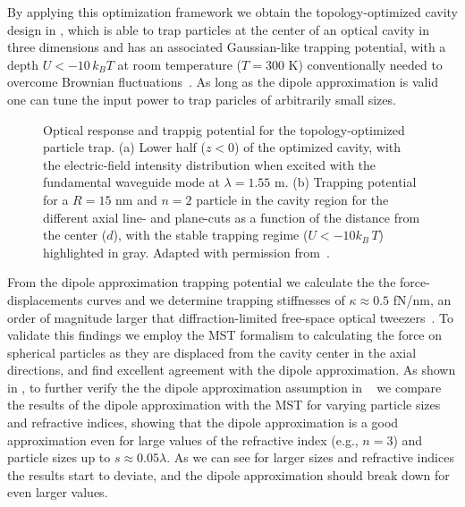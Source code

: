 By applying this optimization framework we obtain the topology-optimized cavity design in , which is able to trap particles at the center of an optical
cavity in three dimensions and has an associated Gaussian-like trapping potential, with a depth  $U<-10\, k_B T$ at room temperature ($T=300$ K) conventionally needed to overcome Brownian fluctuations~\cite{novotny}.
As long as the dipole approximation is valid one can tune the input power to trap paricles of arbitrarily small sizes.

\begin{figure}[tb]
    \centering
    \caption{Optical response and trappig potential for the topology-optimized particle trap. (a) Lower half ($z<0$) of the optimized cavity, with the electric-field intensity
    distribution when excited with the fundamental waveguide mode at $\lambda=1.55$ \textmu m. (b) Trapping potential for a $R=15$ nm and $n=2$ particle in the cavity region for the different axial line- and plane-cuts as a function
    of the distance from the center ($d$), with the stable trapping regime ($U<-10 k_B\, T$) highlighted in gray. Adapted with permission from~\cite{ownpub1}.}
    \label{fig:MST_dipole}
\end{figure}

From the dipole approximation trapping potential we calculate the the force-displacements curves and we determine trapping stiffnesses
of $\kappa \approx 0.5$ fN/nm, an order of magnitude larger that diffraction-limited free-space optical tweezers~\cite{ownpub1}. To validate this findings
we employ the MST formalism to calculating the force on spherical particles as they are displaced from the cavity center in the axial directions, and find excellent
agreement with the dipole approximation. As shown in , to further verify the the dipole approximation assumption in ~\cite{ownpub3} we compare the results of the dipole approximation with the MST
for varying particle sizes and refractive indices, showing that the dipole approximation is a good approximation
even for large values of the refractive index (e.g., $n=3$) and particle sizes up to $s\approx 0.05 \lambda$. As we can see for larger sizes and refractive indices 
the results start to deviate, and the dipole approximation should break down for even larger values.

